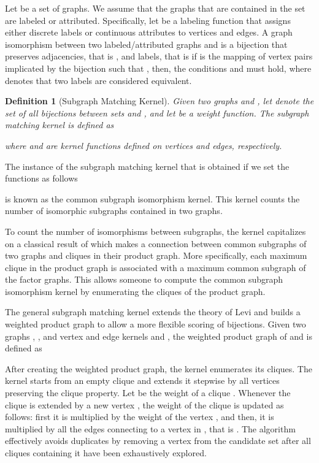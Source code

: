 \documentclass[twoside,11pt]{article}
\newtheorem{definition}{Definition}
\begin{document}
Let  be a set of graphs.
We assume that the graphs that are contained in the set are labeled or attributed.
Specifically, let  be a labeling function that assigns either discrete labels or continuous attributes to vertices and edges.
A graph isomorphism between two labeled/attributed graphs  and  is a bijection  that preserves adjacencies, that is , and labels, that is if  is the mapping of vertex pairs implicated by the bijection  such that , then, the conditions  and  must hold, where  denotes that two labels are considered equivalent.

\begin{definition}[Subgraph Matching Kernel]
  Given two graphs  and , let  denote the set of all bijections between sets  and , and let  be a weight function.
  The subgraph matching kernel is defined as
  
  where  and  are kernel functions defined on vertices and edges, respectively.
\end{definition}

The instance of the subgraph matching kernel that is obtained if we set the  functions as follows

is known as the common subgraph isomorphism kernel.
This kernel counts the number of isomorphic subgraphs contained in two graphs.

To count the number of isomorphisms between subgraphs, the kernel capitalizes on a classical result of  which makes a connection between common subgraphs of two graphs and cliques in their product graph.
More specifically, each maximum clique in the product graph is associated with a maximum common subgraph of the factor graphs.
This allows someone to compute the common subgraph isomorphism kernel by enumerating the cliques of the product graph.

The general subgraph matching kernel extends the theory of Levi and builds a weighted product graph to allow a more flexible scoring of bijections.
Given two graphs , , and vertex and edge kernels  and , the weighted product graph  of  and  is defined as

After creating the weighted product graph, the kernel enumerates its cliques.
The kernel starts from an empty clique and extends it stepwise by all vertices preserving the clique property.
Let  be the weight of a clique .
Whenever the clique  is extended by a new vertex , the weight of the clique is updated as follows: first it is multiplied by the weight of the vertex , and then, it is multiplied by all the edges connecting  to a vertex in , that is .
The algorithm effectively avoids duplicates by removing a vertex from the candidate set after all cliques containing it have been exhaustively explored.
\end{document}
